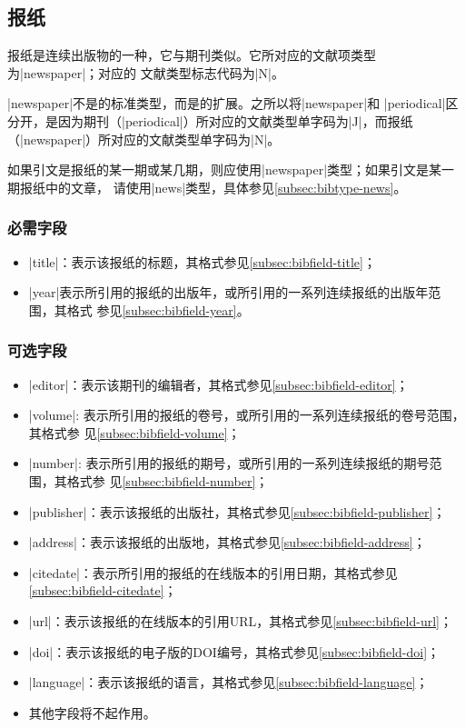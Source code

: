 \subsection{报纸}\label{subsec:bibtype-newspaper}

报纸是连续出版物的一种，它与期刊类似。它所对应的{\BibTeX}文献项类型为|newspaper|；对应的
文献类型标志代码为|N|\cite{gbt3469-1983}。

|newspaper|不是{\BibTeX}的标准类型，而是{\njuthesis}的扩展。之所以将|newspaper|和
|periodical|区分开，是因为期刊（|periodical|）所对应的文献类型单字码为|J|，而报纸
（|newspaper|）所对应的文献类型单字码为|N|\cite{gbt3469-1983}。

\begin{note}
如果引文是报纸的某一期或某几期，则应使用|newspaper|类型；如果引文是某一期报纸中的文章，
请使用|news|类型，具体参见\ref{subsec:bibtype-news}。
\end{note}

\subsubsection{必需字段}

\begin{itemize}
\item |title|：表示该报纸的标题，其格式参见\ref{subsec:bibfield-title}；
\item |year|表示所引用的报纸的出版年，或所引用的一系列连续报纸的出版年范围，其格式
  参见\ref{subsec:bibfield-year}。
\end{itemize}

\subsubsection{可选字段}

\begin{itemize}
\item |editor|：表示该期刊的编辑者，其格式参见\ref{subsec:bibfield-editor}；
\item |volume|: 表示所引用的报纸的卷号，或所引用的一系列连续报纸的卷号范围，其格式参
  见\ref{subsec:bibfield-volume}；
\item |number|: 表示所引用的报纸的期号，或所引用的一系列连续报纸的期号范围，其格式参
  见\ref{subsec:bibfield-number}；
\item |publisher|：表示该报纸的出版社，其格式参见\ref{subsec:bibfield-publisher}；
\item |address|：表示该报纸的出版地，其格式参见\ref{subsec:bibfield-address}；
\item |citedate|：表示所引用的报纸的在线版本的引用日期，其格式参见\ref{subsec:bibfield-citedate}；
\item |url|：表示该报纸的在线版本的引用URL，其格式参见\ref{subsec:bibfield-url}；
\item |doi|：表示该报纸的电子版的DOI编号，其格式参见\ref{subsec:bibfield-doi}；
\item |language|：表示该报纸的语言，其格式参见\ref{subsec:bibfield-language}；
\item 其他字段将不起作用。
\end{itemize}

